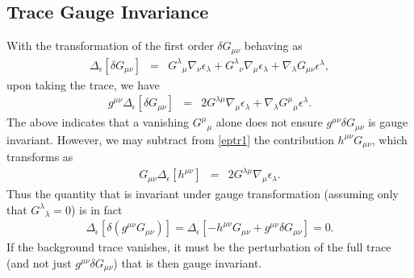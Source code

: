 \documentclass[10pt,letterpaper]{article}
\numberwithin{equation}{section}
\begin{document}
\subsection{Trace Gauge Invariance}
\label{sec:Remark on Trace}
With the transformation of the first order $\delta G_{\mu\nu}$ behaving as
\begin{eqnarray}
\Delta_\epsilon[\delta G_{\mu\nu}] &=& G^\lambda{}_\mu \nabla_\nu \epsilon_\lambda + G^\lambda{}_\nu \nabla_\mu \epsilon_\lambda + \nabla_\lambda G_{\mu\nu} \epsilon^\lambda,
\label{eptr1}
\end{eqnarray}
upon taking the trace, we have
\begin{eqnarray}
g^{\mu\nu}\Delta_{\epsilon}[\delta G_{\mu\nu}] &=& 2 G^{\lambda\mu} \nabla_\mu \epsilon_\lambda + \nabla_\lambda G^\mu{}_\mu \epsilon^\lambda. 
\end{eqnarray}
The above indicates that a vanishing $G^\mu{}_\mu$ alone does not ensure $g^{\mu\nu}\delta G_{\mu\nu}$ is gauge invariant. However, we may subtract from \eqref{eptr1} the contribution $h^{\mu\nu}G_{\mu\nu}$, which transforms as
\begin{eqnarray}
G_{\mu\nu}\Delta_\epsilon[h^{\mu\nu}] &=& 2 G^{\lambda\mu} \nabla_\mu \epsilon_\lambda.
\end{eqnarray}
Thus the quantity that is invariant under gauge transformation (assuming only that $G^\lambda{}_\lambda = 0$) is in fact
\begin{eqnarray}
\Delta_\epsilon[ \delta(g^{\mu\nu} G_{\mu\nu})]=\Delta_\epsilon[ -h^{\mu\nu}G_{\mu\nu} + g^{\mu\nu}\delta G_{\mu\nu}] = 0. 
\end{eqnarray}
If the background trace vanishes, it must be the perturbation of the full trace (and not just $g^{\mu\nu} \delta G_{\mu\nu}$) that is then gauge invariant. 
\end{document}
